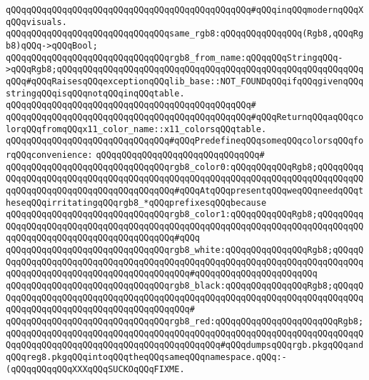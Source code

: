 \verb|qQQqqQQqqQQqqQQqqQQqqQQqqQQqqQQqqQQqqQQqqQQqqQQq#qQQqinqQQqmodernqQQqXqQQqvisuals.|\newline
\newline
\verb|qQQqqQQqqQQqqQQqqQQqqQQqqQQqqQQqsame_rgb8:qQQqqQQqqQQqqQQq(Rgb8,qQQqRgb8)qQQq->qQQqBool;|\newline
\newline
\verb|qQQqqQQqqQQqqQQqqQQqqQQqqQQqqQQqrgb8_from_name:qQQqqQQqStringqQQq->qQQqRgb8;qQQqqQQqqQQqqQQqqQQqqQQqqQQqqQQqqQQqqQQqqQQqqQQqqQQqqQQqqQQqqQQq#qQQqRaisesqQQqexceptionqQQqlib_base::NOT_FOUNDqQQqifqQQqgivenqQQqstringqQQqisqQQqnotqQQqinqQQqtable.|\newline
\verb|qQQqqQQqqQQqqQQqqQQqqQQqqQQqqQQqqQQqqQQqqQQqqQQq#|\newline
\verb|qQQqqQQqqQQqqQQqqQQqqQQqqQQqqQQqqQQqqQQqqQQqqQQq#qQQqReturnqQQqaqQQqcolorqQQqfromqQQqx11_color_name::x11_colorsqQQqtable.|\newline
\newline
\verb|qQQqqQQqqQQqqQQqqQQqqQQqqQQqqQQq#qQQqPredefineqQQqsomeqQQqcolorsqQQqforqQQqconvenience:|\newline
\verb|qQQqqQQqqQQqqQQqqQQqqQQqqQQqqQQq#|\newline
\verb|qQQqqQQqqQQqqQQqqQQqqQQqqQQqqQQqrgb8_color0:qQQqqQQqqQQqRgb8;qQQqqQQqqQQqqQQqqQQqqQQqqQQqqQQqqQQqqQQqqQQqqQQqqQQqqQQqqQQqqQQqqQQqqQQqqQQqqQQqqQQqqQQqqQQqqQQqqQQqqQQqqQQqqQQq#qQQqAtqQQqpresentqQQqweqQQqneedqQQqtheseqQQqirritatingqQQqrgb8_*qQQqprefixesqQQqbecause|\newline
\verb|qQQqqQQqqQQqqQQqqQQqqQQqqQQqqQQqrgb8_color1:qQQqqQQqqQQqRgb8;qQQqqQQqqQQqqQQqqQQqqQQqqQQqqQQqqQQqqQQqqQQqqQQqqQQqqQQqqQQqqQQqqQQqqQQqqQQqqQQqqQQqqQQqqQQqqQQqqQQqqQQqqQQqqQQq#qQQq|\newline
\verb|qQQqqQQqqQQqqQQqqQQqqQQqqQQqqQQqrgb8_white:qQQqqQQqqQQqqQQqRgb8;qQQqqQQqqQQqqQQqqQQqqQQqqQQqqQQqqQQqqQQqqQQqqQQqqQQqqQQqqQQqqQQqqQQqqQQqqQQqqQQqqQQqqQQqqQQqqQQqqQQqqQQqqQQqqQQq#qQQqqQQqqQQqqQQqqQQqqQQq|\newline
\verb|qQQqqQQqqQQqqQQqqQQqqQQqqQQqqQQqrgb8_black:qQQqqQQqqQQqqQQqRgb8;qQQqqQQqqQQqqQQqqQQqqQQqqQQqqQQqqQQqqQQqqQQqqQQqqQQqqQQqqQQqqQQqqQQqqQQqqQQqqQQqqQQqqQQqqQQqqQQqqQQqqQQqqQQqqQQq#|\newline
\verb|qQQqqQQqqQQqqQQqqQQqqQQqqQQqqQQqrgb8_red:qQQqqQQqqQQqqQQqqQQqqQQqRgb8;qQQqqQQqqQQqqQQqqQQqqQQqqQQqqQQqqQQqqQQqqQQqqQQqqQQqqQQqqQQqqQQqqQQqqQQqqQQqqQQqqQQqqQQqqQQqqQQqqQQqqQQqqQQqqQQq#qQQqdumpsqQQqrgb.pkgqQQqandqQQqreg8.pkgqQQqintoqQQqtheqQQqsameqQQqnamespace.qQQq:-(qQQqqQQqqQQqXXXqQQqSUCKOqQQqFIXME.|\newline
